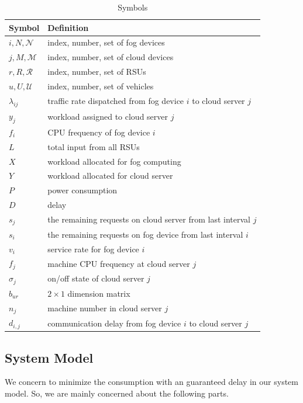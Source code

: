 \documentclass[twoside,twocolumn]{article}
\begin{document}
\begin{table}[h]
	\centering
	\begin{tabular}{p{1cm}p{5cm}}
	\hline
	Symbol & Definition \\\hline
	$i,N,\mathcal{N}$ & index, number, set of fog devices\\
	$j,M,\mathcal{M}$ & index, number, set of cloud devices\\
	$r,R,\mathcal{R}$ & index, number, set of RSUs\\
	$u,U,\mathcal{U}$ & index, number, set of vehicles\\
	$\lambda_{ij}$    & traffic rate dispatched from fog device $i$ to cloud server $j$\\
	$y_j$             & workload assigned to cloud server $j$\\
	$f_i$	          & CPU frequency of fog device $i$ \\
	$L$               & total input from all RSUs\\
	$X$               & workload allocated for fog computing\\
	$Y$               & workload allocated for cloud server\\
	$P$               & power consumption\\
	$D$               & delay\\
	$s_j$             & the remaining requests on cloud server from last interval $j$\\
	$s_i$             & the remaining requests on fog device  from last interval $i$\\
	$v_i$             & service rate for fog device $i$\\
	$f_j$             & machine CPU frequency at cloud server $j$\\
	$\sigma_j$        & on/off state of cloud server $j$\\
	$b_{ur}$               & $2 \times 1$ dimension matrix\\      
	$n_j$             & machine number in cloud server $j$\\
	$d_{i,j}$         & communication delay from fog device $i$ to cloud server $j$\\\hline
	\end{tabular}
	\caption{Symbols}
\end{table}


\subsection{System Model}
We concern to minimize the consumption with an guaranteed delay in our system model. So, we are mainly concerned about the following parts.
\end{document}
